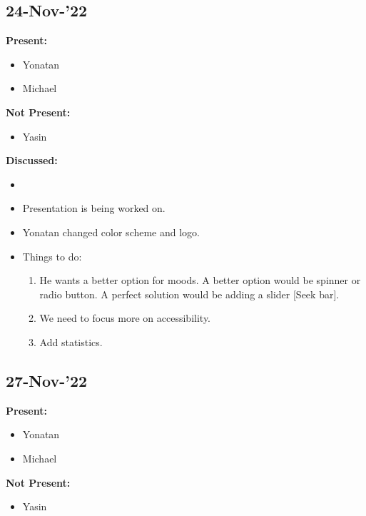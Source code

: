 \documentclass[11pt]{article}
\begin{document}
    \subsection{24-Nov-’22}\label{subsec:24-nov-22}
    \textbf{Present:}
    \begin{itemize}
        \item Yonatan
        \item Michael
    \end{itemize}

    \textbf{Not Present:}

    \begin{itemize}
        \item Yasin
    \end{itemize}

    \textbf{Discussed:}

    \begin{itemize}
        \item
        \item Presentation is being worked on.
        \item Yonatan changed color scheme and logo.
        \item Things to do:
        \begin{enumerate}
            \item  He wants a better option for moods.
            A better option would be spinner or radio button.
            A perfect solution would be adding a slider [Seek bar].
            \item  We need to focus more on accessibility.
            \item  Add statistics.
        \end{enumerate}
    \end{itemize}

    \subsection{27-Nov-’22}\label{subsec:27-nov-22}
    \textbf{Present:}
    \begin{itemize}
        \item Yonatan
        \item Michael
    \end{itemize}

    \textbf{Not Present:}

    \begin{itemize}
        \item Yasin
    \end{itemize}
\end{document}
